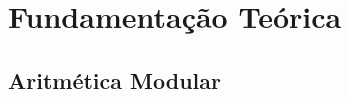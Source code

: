 \chapter{Fundamentação Teórica}\label{cap:fundamentacao}

%
%

\section{Aritmética Modular} \label{sec:aritmeticamodular}






